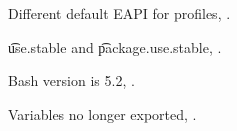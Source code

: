 \begin{compactitem}
\item Different default EAPI for profiles, .
\item \t{use.stable} and \t{package.use.stable}, .
\item Bash version is 5.2, .
\item Variables no longer exported, .
\end{compactitem}



